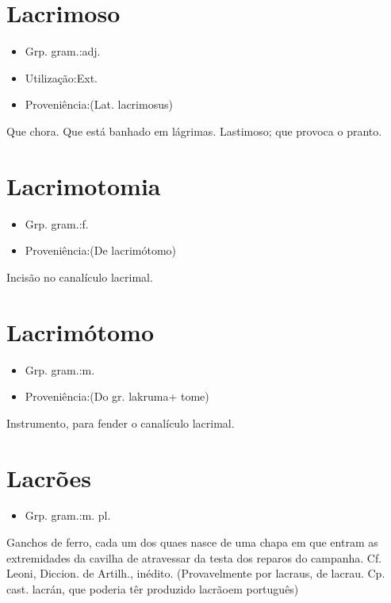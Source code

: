 \section{Lacrimoso}
\begin{itemize}
\item {Grp. gram.:adj.}
\end{itemize}
\begin{itemize}
\item {Utilização:Ext.}
\end{itemize}
\begin{itemize}
\item {Proveniência:(Lat. \textunderscore lacrimosus\textunderscore )}
\end{itemize}
Que chora.
Que está banhado em lágrimas.
Lastimoso; que provoca o pranto.
\section{Lacrimotomia}
\begin{itemize}
\item {Grp. gram.:f.}
\end{itemize}
\begin{itemize}
\item {Proveniência:(De \textunderscore lacrimótomo\textunderscore )}
\end{itemize}
Incisão no canalículo lacrimal.
\section{Lacrimótomo}
\begin{itemize}
\item {Grp. gram.:m.}
\end{itemize}
\begin{itemize}
\item {Proveniência:(Do gr. \textunderscore lakruma\textunderscore  + \textunderscore tome\textunderscore )}
\end{itemize}
Instrumento, para fender o canalículo lacrimal.
\section{Lacrões}
\begin{itemize}
\item {Grp. gram.:m. pl.}
\end{itemize}
Ganchos de ferro, cada um dos quaes nasce de uma chapa em que entram as extremidades da cavilha de atravessar da testa dos reparos do campanha. Cf. Leoni, \textunderscore Diccion. de Artilh.\textunderscore , inédito.
(Provavelmente por \textunderscore lacraus\textunderscore , de \textunderscore lacrau\textunderscore . Cp. cast. \textunderscore lacrán\textunderscore , que poderia têr produzido \textunderscore lacrão\textunderscore  em português)

